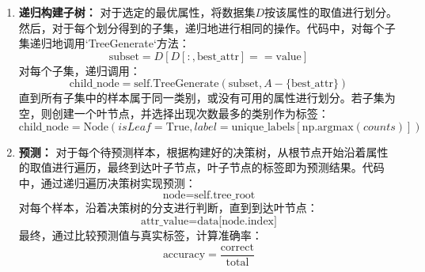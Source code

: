 \documentclass[12pt,a4paper,oneside]{article}
\begin{document}
\begin{enumerate}
    \item \textbf{递归构建子树：}
    对于选定的最优属性，将数据集$D$按该属性的取值进行划分。然后，对于每个划分得到的子集，递归地进行相同的操作。代码中，对每个子集递归地调用`TreeGenerate`方法：
    \[
    \text{subset} = D[D[:, \text{best\_attr}] == \text{value}]
    \]
    对每个子集，递归调用：
    \[
    \text{child\_node} = \text{self.TreeGenerate}(\text{subset}, A - \{\text{best\_attr}\})
    \]
    直到所有子集中的样本属于同一类别，或没有可用的属性进行划分。若子集为空，则创建一个叶节点，并选择出现次数最多的类别作为标签：
    \[
    \text{child\_node} = \text{Node}(isLeaf=\text{True}, label=\text{unique\_labels}[\text{np.argmax}(counts)])
    \]

    \item \textbf{预测：}
    对于每个待预测样本，根据构建好的决策树，从根节点开始沿着属性的取值进行遍历，最终到达叶子节点，叶子节点的标签即为预测结果。代码中，通过递归遍历决策树实现预测：
    \[
    \text{node} = \text{self.tree\_root}
    \]
    对每个样本，沿着决策树的分支进行判断，直到到达叶节点：
    \[
    \text{attr\_value} = \text{data[node.index]}
    \]
    最终，通过比较预测值与真实标签，计算准确率：
    \[
    \text{accuracy} = \frac{\text{correct}}{\text{total}}
    \]
\end{enumerate}
\end{document}
